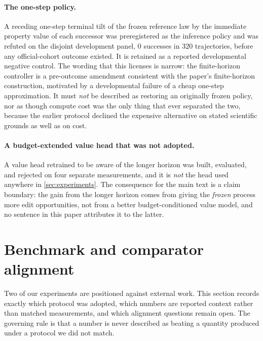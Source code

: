 \paragraph{The one-step policy.}
A receding one-step terminal tilt of the frozen reference law by the immediate property value of each successor was preregistered as the inference policy and was refuted on the disjoint development panel, $0$ successes in $320$ trajectories, before any official-cohort outcome existed.
It is retained as a reported developmental negative control.
The wording that this licenses is narrow: the finite-horizon controller is a pre-outcome amendment consistent with the paper's finite-horizon construction, motivated by a developmental failure of a cheap one-step approximation.
It must \emph{not} be described as restoring an originally frozen policy, nor as though compute cost was the only thing that ever separated the two, because the earlier protocol declined the expensive alternative on stated scientific grounds as well as on cost.

\paragraph{A budget-extended value head that was not adopted.}
A value head retrained to be aware of the longer horizon was built, evaluated, and rejected on four separate measurements, and it is \emph{not} the head used anywhere in \cref{sec:experiments}.
The consequence for the main text is a claim boundary: the gain from the longer horizon comes from giving the \emph{frozen} process more edit opportunities, not from a better budget-conditioned value model, and no sentence in this paper attributes it to the latter.

\section{Benchmark and comparator alignment}
\label{app:alignment}

Two of our experiments are positioned against external work. This section records exactly which protocol was adopted, which numbers are reported context rather than matched measurements, and which alignment questions remain open. The governing rule is that a \method{} number is never described as beating a quantity produced under a protocol we did not match.


